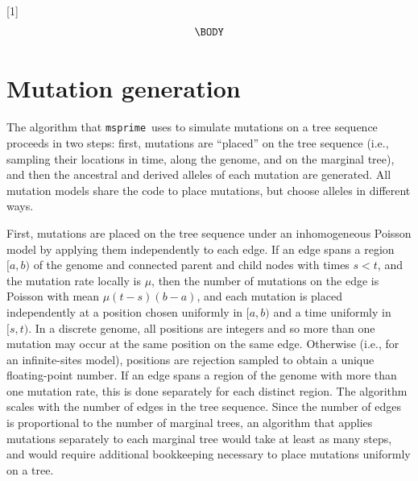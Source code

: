 \documentclass{article}
\newcommand{\msprime}[0]{\texttt{msprime}}
\begin{document}




 \newcommand{\be}{\begin{equation}}
 \newcommand{\ee}{\end{equation}}
 \newcommand{\bd}{\begin{displaymath}}
 \newcommand{\ed}{\end{displaymath}}
\newcommand{\IN}{\ensuremath{\mathds{N}}}%
\newcommand{\EE}[1]{\ensuremath{\mathds{E}\left[ #1 \right]}}%
\newcommand{\one}[1]{\ensuremath{\mathds{1}_{\left\{ #1 \right\}}}}%
\newcommand{\prb}[1]{\ensuremath{\mathds{P}\left( #1 \right) } }%

[1]{%
\begin{equation}
\label{#1}
\begin{split}
  \BODY
\end{split}\end{equation}
}

\setcounter{secnumdepth}{2} %

\appendix

\section*{Mutation generation}
\label{app-mutation-algorithm}

The algorithm that \msprime\ uses to simulate mutations on a tree sequence
proceeds in two steps:
first, mutations are ``placed'' on the tree sequence
(i.e., sampling their locations in time, along the genome, and on the marginal tree),
and then the ancestral and derived alleles of each mutation are generated.
All mutation models share the code to place mutations,
but choose alleles in different ways.

First, mutations are placed on the tree sequence under an inhomogeneous Poisson model
by applying them independently to each edge.
If an edge spans a region $[a, b)$ of the genome
and connected parent and child nodes with times $s < t$,
and the mutation rate locally is $\mu$,
then the number of mutations on the edge is Poisson with mean $\mu (t-s) (b-a)$,
and each mutation is placed independently at a position chosen uniformly in $[a,b)$
and a time uniformly in $[s,t)$.
In a discrete genome, all positions are integers and so more than one mutation
may occur at the same position on the same edge.
Otherwise (i.e., for an infinite-sites model),
positions are rejection sampled to obtain a unique floating-point number.
If an edge spans a region of the genome with more than one mutation rate,
this is done separately for each distinct region.
The algorithm scales with the number of edges in the tree sequence.
Since the number of edges is proportional to the number of marginal trees,
an algorithm that applies mutations separately to each marginal tree
would take at least as many steps,
and would require additional bookkeeping necessary to place mutations uniformly on a tree.
\end{document}
